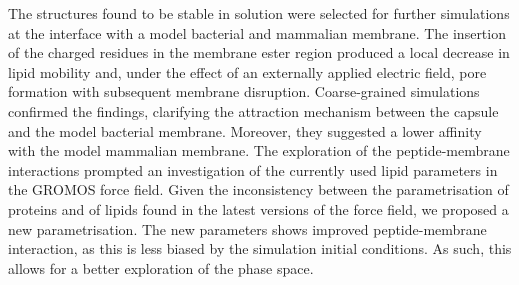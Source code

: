 \begin{onehalfspacing}
The structures found to be stable in solution were selected for further simulations at the interface with a model bacterial and mammalian membrane.
%
The insertion of the charged residues in the membrane ester region produced a local decrease in lipid mobility and, under the effect of an externally applied electric field, pore formation with subsequent membrane disruption.
%
Coarse-grained simulations confirmed the findings, clarifying the attraction mechanism between the capsule and the model bacterial membrane. Moreover, they suggested a lower affinity with the model mammalian membrane.
%
The exploration of the peptide-membrane interactions prompted an investigation of the currently used lipid parameters in the GROMOS force field. Given the inconsistency between the parametrisation of proteins and of lipids found in the latest versions of the force field, we proposed a new parametrisation. The new parameters shows improved peptide-membrane interaction, as this is less biased by the simulation initial conditions. As such, this allows for a better exploration of the phase space.

\end{onehalfspacing}


\cleardoublepage
\newpage
\thispagestyle{plain} %
\mbox{}


\begin{onehalfspacing}
\tableofcontents*

\cleardoublepage

\listoffigures*

\cleardoublepage

\listoftables*
\end{onehalfspacing}


\newlength{\nomitemorigsep}
\setlength{\nomitemorigsep}{\nomitemsep}
\setlength{\nomitemsep}{-\parsep}

\renewcommand{\nomgroup}[1]{
%
\itemsep\nomitemorigsep
\ifthenelse{\equal{#1}{A}}{\item[\textbf{Acronyms}]}{
%
\ifthenelse{\equal{#1}{B}}{\item[\textbf{ccc}]}{
%
\ifthenelse{\equal{#1}{K}}{\item[\textbf{vvv}]}{
}}}
\itemsep\nomitemsep}


\printnomenclature[7.6em]

\cleardoublepage
\newpage
\thispagestyle{plain} %
\mbox{}


\thispagestyle{empty}






